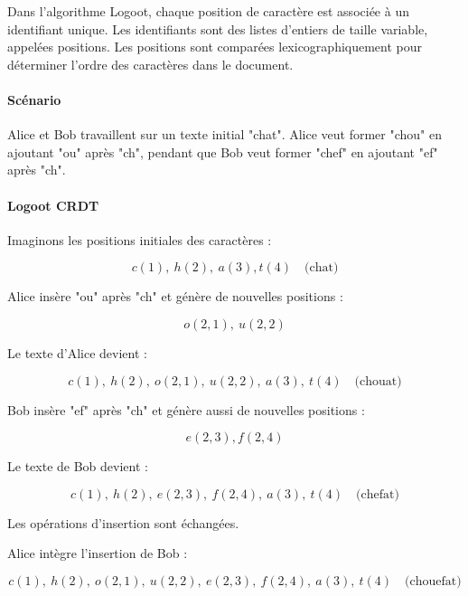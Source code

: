 Dans l'algorithme Logoot, chaque position de caractère est associée à un identifiant unique. Les identifiants sont des listes d'entiers de taille variable, appelées positions. Les positions sont comparées lexicographiquement pour déterminer l'ordre des caractères dans le document.

\paragraph{Scénario}
Alice et Bob travaillent sur un texte initial "chat". Alice veut former "chou" en ajoutant "ou" après "ch", pendant que Bob veut former "chef" en ajoutant "ef" après "ch".

\paragraph{Logoot CRDT}
Imaginons les positions initiales des caractères :

\begin{equation}
    c(1),\ h(2), \ a(3), t(4) \quad \text{(chat)}
\end{equation}

Alice insère "ou" après "ch" et génère de nouvelles positions :

\begin{equation}
    o(2, 1), \ u(2, 2)
\end{equation}

Le texte d'Alice devient :

\begin{equation}
    c(1), \ h(2), \ o(2, 1), \ u(2, 2), \ a(3), \ t(4) \quad \text{(chouat)}
\end{equation}

Bob insère "ef" après "ch" et génère aussi de nouvelles positions :

\begin{equation}
    e(2, 3), f(2, 4)
\end{equation}

Le texte de Bob devient :

\begin{equation}
    c(1), \ h(2), \ e(2, 3), \ f(2, 4), \ a(3), \ t(4) \quad \text{(chefat)}
\end{equation}

Les opérations d'insertion sont échangées.

Alice intègre l'insertion de Bob :

\begin{equation}
    c(1), \ h(2), \ o(2, 1), \ u(2, 2), \ e(2, 3), \ f(2, 4), \ a(3), \ t(4) \quad \text{(chouefat)}
\end{equation}

